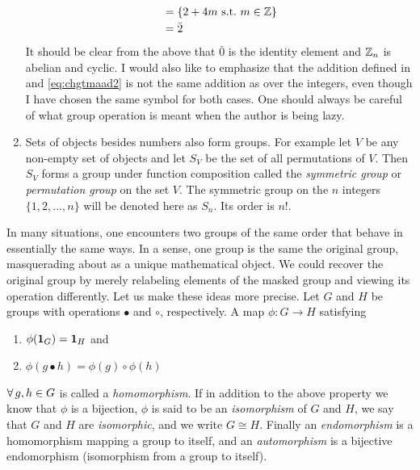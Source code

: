 \begin{example*}{}{}
\begin{enumerate}
\begin{equation}
\begin{aligned}
                         &=\{2+4m~\text{s.t.}~ m\in \mathbb{Z}\}\\
                         &=\bar{2}
          \end{aligned}
        \end{equation}
        It should be clear from the above that $\bar{0}$ is the identity
        element and $\mathbb{Z}_n$ is abelian and cyclic. I would
        also like to emphasize that the addition defined in 
         and \eqref{eq:chgtmaad2} is not the same
        addition as over the integers, even though I have chosen the same
        symbol for both cases. One should always be careful of what group
        operation is meant when the author is being lazy. 
  \item Sets of objects besides numbers also form groups. For example let $V$ 
        be any non-empty set of objects and let $S_{V}$ be the set of all
        permutations of $V$. Then $S_{V}$ forms a group under function
        composition called the {\it symmetric group} 
        or {\it permutation group} on the set $V$.
        The symmetric group on the $n$ integers $\{1,2,...,n\}$ will be
        denoted here as $S_n$. Its order is $n!$.
\end{enumerate}
\end{example*}

In many situations, one encounters two groups of the same order that behave in
essentially the same ways. In a sense, one group is the same the original group,
masquerading about as a unique mathematical object. We could recover the
original group by merely relabeling elements of the masked group and viewing
its operation differently. Let us make these ideas more precise.
Let $G$ and $H$ be groups with operations $\bullet$ and
$\circ$, respectively. A map $\phi : G\to H$ satisfying
\begin{enumerate}
  \item $\phi({\mathbf 1}_G)={\mathbf 1}_H$ and
  \item $\phi(g \bullet h)=\phi(g)\circ\phi(h)$
\end{enumerate}
$\operatorname{\forall} g,h\in G$ is called a {\it homomorphism}. 
If in addition to the above property we know that $\phi$ is a bijection, 
$\phi$ is said to be an {\it isomorphism} of $G$ and 
$H$, we say that $G$ and $H$ are {\it isomorphic}, and we write $G\cong H$. 
Finally an {\it endomorphism} is a homomorphism 
mapping a group to itself, and an {\it automorphism}
is a bijective endomorphism (isomorphism from a group to itself).

